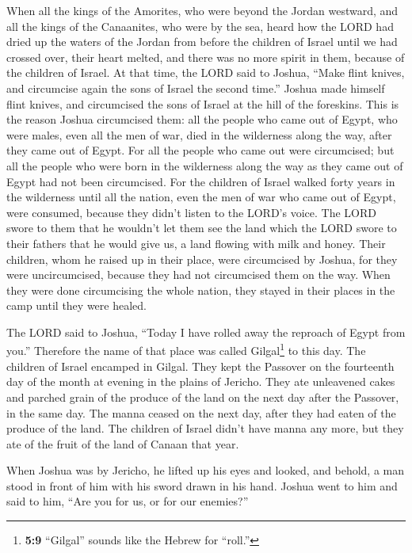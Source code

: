  When all the kings of the Amorites, who were beyond the
Jordan westward, and all the kings of the Canaanites, who were by the
sea, heard how the LORD had dried up the waters of the Jordan from
before the children of Israel until we had crossed over, their heart
melted, and there was no more spirit in them, because of the children of
Israel.  At that time, the LORD said to Joshua, ``Make
flint knives, and circumcise again the sons of Israel the second time.''
 Joshua made himself flint knives, and circumcised the
sons of Israel at the hill of the foreskins.  This is the
reason Joshua circumcised them: all the people who came out of Egypt,
who were males, even all the men of war, died in the wilderness along
the way, after they came out of Egypt.  For all the people
who came out were circumcised; but all the people who were born in the
wilderness along the way as they came out of Egypt had not been
circumcised.  For the children of Israel walked forty
years in the wilderness until all the nation, even the men of war who
came out of Egypt, were consumed, because they didn't listen to the
LORD's voice. The LORD swore to them that he wouldn't let them see the
land which the LORD swore to their fathers that he would give us, a land
flowing with milk and honey.  Their children, whom he
raised up in their place, were circumcised by Joshua, for they were
uncircumcised, because they had not circumcised them on the way.
 When they were done circumcising the whole nation, they
stayed in their places in the camp until they were healed.

 The LORD said to Joshua, ``Today I have rolled away the
reproach of Egypt from you.'' Therefore the name of that place was
called Gilgal\footnote{\textbf{5:9} ``Gilgal'' sounds like the Hebrew
  for ``roll.''} to this day.  The children of Israel
encamped in Gilgal. They kept the Passover on the fourteenth day of the
month at evening in the plains of Jericho.  They ate
unleavened cakes and parched grain of the produce of the land on the
next day after the Passover, in the same day.  The manna
ceased on the next day, after they had eaten of the produce of the land.
The children of Israel didn't have manna any more, but they ate of the
fruit of the land of Canaan that year.

 When Joshua was by Jericho, he lifted up his eyes and
looked, and behold, a man stood in front of him with his sword drawn in
his hand. Joshua went to him and said to him, ``Are you for us, or for
our enemies?''


